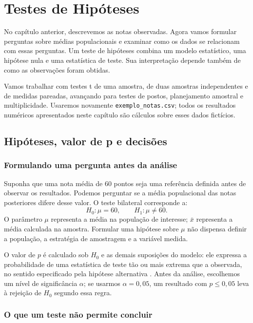 \chapter{Testes de Hipóteses}
\label{cap:hipoteses}

No capítulo anterior, descrevemos as notas observadas. Agora vamos formular perguntas sobre médias populacionais e examinar como os dados se relacionam com essas perguntas. Um teste de hipóteses combina um modelo estatístico, uma hipótese nula e uma estatística de teste. Sua interpretação depende também de como as observações foram obtidas.

Vamos trabalhar com testes t de uma amostra, de duas amostras independentes e de medidas pareadas, avançando para testes de postos, planejamento amostral e multiplicidade. Usaremos novamente \texttt{exemplo\_notas.csv}; todos os resultados numéricos apresentados neste capítulo são cálculos sobre esses dados fictícios.

\section{Hipóteses, valor de p e decisões}

\subsection{Formulando uma pergunta antes da análise}

Suponha que uma nota média de $60$ pontos seja uma referência definida antes de observar os resultados. Podemos perguntar se a média populacional das notas posteriores difere desse valor. O teste bilateral corresponde a:
\[
H_0:\mu=60,\qquad H_1:\mu\neq60.
\]
O parâmetro $\mu$ representa a média na população de interesse; $\bar{x}$ representa a média calculada na amostra. Formular uma hipótese sobre $\mu$ não dispensa definir a população, a estratégia de amostragem e a variável medida.

O valor de $p$ é calculado sob $H_0$ e as demais suposições do modelo: ele expressa a probabilidade de uma estatística de teste tão ou mais extrema que a observada, no sentido especificado pela hipótese alternativa \parencite{NISTValorP}. Antes da análise, escolhemos um nível de significância $\alpha$; se usarmos $\alpha=0{,}05$, um resultado com $p\leq0{,}05$ leva à rejeição de $H_0$ segundo essa regra.

\subsection{O que um teste não permite concluir}

